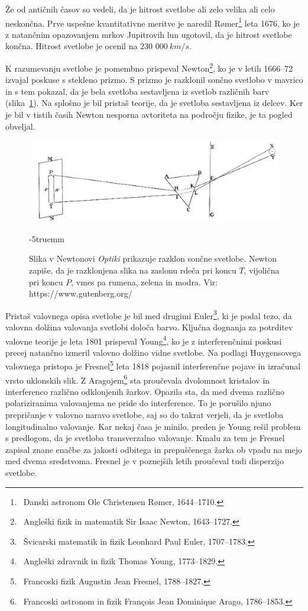 Že od antičnih časov so vedeli, da
je hitrost svetlobe ali zelo velika ali celo neskončna. Prve uspešne kvantitativne
meritve je naredil R\o{}mer\footnote{~Danski astronom
Ole Christensen R\o{}mer, 1644--1710.} leta 1676, ko je z natančnim opazovanjem 
mrkov Jupitrovih lun ugotovil, da je hitrost svetlobe končna. Hitrost svetlobe je
ocenil na $230\,\,000~\si{km/s}$.

K razumevanju svetlobe je pomembno prispeval Newton\footnote{~Angleški
fizik in matematik Sir Isaac Newton, 1643--1727.}, ko je v letih 1666--72 
izvajal poskuse s stekleno prizmo. S prizmo je razklonil sončno svetlobo v
mavrico in s tem pokazal, da je bela svetloba sestavljena 
iz svetlob različnih barv (slika~\ref{fig:01_Newton}). Na splošno je bil pristaš teorije, da je 
svetloba sestavljena iz delcev. Ker je bil v tistih časih 
Newton nesporna avtoriteta na področju fizike, je ta pogled obveljal.
\begin{figure}[ht]
\centering
\includegraphics[width=10truecm]{slike/01_Newton.jpg}
\caption{Slika v Newtonovi {\it Optiki} prikazuje razklon sončne svetlobe. Newton 
zapiše, da je razklonjena slika na zaslonu rdeča pri koncu $T$, vijolična
pri koncu $P$, vmes pa rumena, zelena in modra. Vir: https://www.gutenberg.org/}
\label{fig:01_Newton}
\vglue-5truemm
\end{figure}

Pristaš valovnega opisa svetlobe je bil med drugimi Euler\footnote{~Švicarski 
matematik in fizik Leonhard Paul Euler, 1707--1783.}, ki je podal tezo, 
da valovna dolžina valovanja svetlobi določa barvo.
Ključna dognanja za potrditev valovne teorije je leta 1801 prispeval 
Young\footnote{~Angleški zdravnik in fizik Thomas Young, 1773--1829.},
ko je z interferenčnimi poskusi precej natančno izmeril valovno dolžino 
vidne svetlobe. Na podlagi Huygensovega valovnega pristopa je 
Fresnel\footnote{~Francoski fizik Augustin Jean Fresnel, 1788--1827.}
leta 1818 pojasnil interferenčne pojave in izračunal vrsto 
uklonskih slik. Z Aragojem\footnote{~Francoski astronom in fizik
Fran\c{c}ois Jean Dominique Arago, 1786--1853.} sta proučevala
dvolomnost kristalov in interferenco različno odklonjenih žarkov. 
Opazila sta, da med dvema različno polariziranima valovanjema ne 
pride do interference. To je porušilo njuno prepričanje v valovno 
naravo svetlobe, saj so do takrat verjeli, da je svetloba
longitudinalno valovanje. Kar nekaj časa je minilo, preden je Young 
rešil problem s predlogom, da je svetloba transverzalno valovanje.
Kmalu za tem je Fresnel zapisal znane enačbe za jakosti odbitega 
in prepuščenega žarka ob vpadu na mejo med dvema sredstvoma.
Fresnel je v poznejših letih proučeval tudi disperzijo svetlobe.

